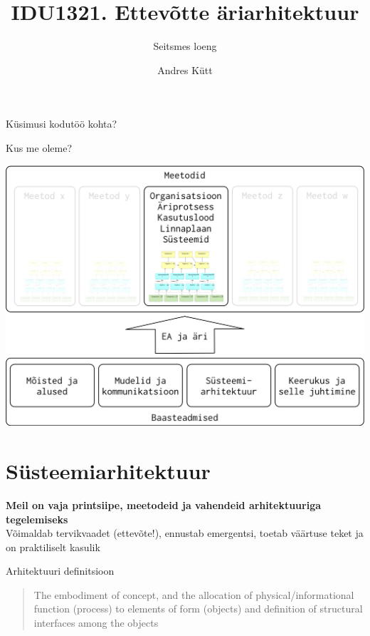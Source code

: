 \documentclass{beamer}
\title{IDU1321. Ettevõtte äriarhitektuur}
\subtitle{Seitsmes loeng}
\author{Andres Kütt}
\institute{Arhitekt}
\begin{document}
\begin{frame}
\titlepage
\end{frame}


\begin{frame}[standout]
Küsimusi kodutöö kohta?
\end{frame}


\begin{frame}{Kus me oleme?}
	\begin{center}
		\includegraphics[width=.8\textwidth]{aine_struktuur}
	\end{center}
\end{frame}

\section{Süsteemiarhitektuur}
\begin{frame}[fragile]
	\begin{center}
		\LARGE{\textbf{Meil on vaja printsiipe, meetodeid ja vahendeid arhitektuuriga tegelemiseks}}
		\\[4cm]
		\small{Võimaldab tervikvaadet (ettevõte!), ennustab emergentsi, toetab väärtuse teket ja on praktiliselt kasulik}
	\end{center}
\end{frame}

\begin{frame}{Arhitektuuri definitsioon}
	\blockquote{The embodiment of concept, and the allocation of physical/informational function (process) to elements of form (objects) and definition of structural interfaces among the objects}

\cite{sysengineering}

\end{frame}
\end{document}
